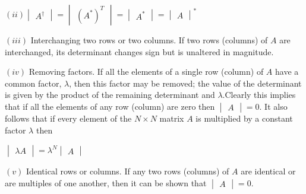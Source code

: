 \documentclass[fleqn]{article}
\begin{document}
\begin{enumerate}
    \bigbreak

    $
    (ii) \begin{vmatrix}
      A^{\dagger}
    \end{vmatrix}=\begin{vmatrix}
      (A^*)^T
    \end{vmatrix}=\begin{vmatrix}
      A^*
    \end{vmatrix}=\begin{vmatrix}
      A
    \end{vmatrix}^*
    $

    \bigbreak

    $(iii)$ Interchanging two rows or two columns. If two rows (columns) of $A$ are interchanged, its determinant changes sign but is unaltered in magnitude.

    \bigbreak

    $(iv)$ Removing factors. If all the elements of a single row (column) of $A$ have a common factor, $\lambda$, then this factor may be removed;  the value of the determinant is given by the product of the remaining determinant and $\lambda$.Clearly this implies that if all the elements of any row (column) are zero then $\begin{vmatrix}
      A
    \end{vmatrix}=0$. It also follows that if every element of the $N \times N$ matrix $A$ is multiplied by a constant factor $\lambda$ then

    $\begin{vmatrix}
      \lambda A
    \end{vmatrix}= \lambda^N \begin{vmatrix}
      A
    \end{vmatrix}
    $

    \bigbreak

    $(v)$ Identical rows or columns. If any two rows (columns) of $A$ are identical or are multiples of one another, then it can be shown that $\begin{vmatrix}
      A
    \end{vmatrix}=0$.


\end{enumerate}
\end{document}
